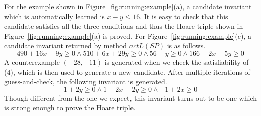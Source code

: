 \begin{example}
For the example shown in Figure~\ref{fig:running:example}(a), a candidate invariant which is automatically learned is $x - y \leq 16$. It is easy to check that this candidate satisfies all the three conditions and thus the Hoare triple shown in Figure~\ref{fig:running:example}(a) is proved. For Figure~\ref{fig:running:example}(c), a candidate invariant returned by method $actL(SP)$ is as follows.
\[
490 + 16x - 9y \geq 0 \land  510 + 6x + 29y \geq 0 \land 56 - y \geq 0 \land 166 - 2x + 5y \geq 0
\]
A counterexample $(-28, -11)$ is generated when we check the satisfiability of (4), which is then used to generate a new candidate. After multiple iterations of guess-and-check, the following invariant is generated.
\[
1 + 2y \geq 0 \land 1 + 2x - 2y \geq 0 \land -1 + 2x \geq 0
\]
Though different from the one we expect, this invariant turns out to be one which is strong enough to prove the Hoare triple.
\end{example}


